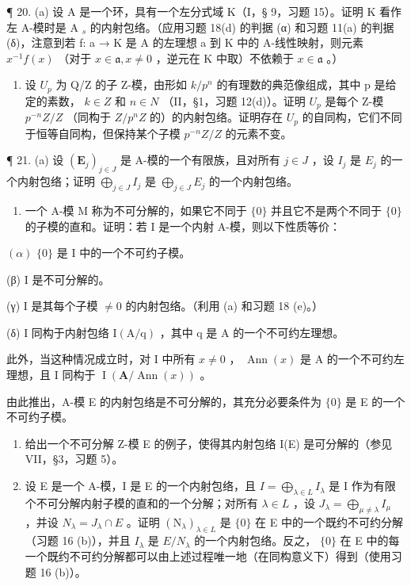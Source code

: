 ¶ 20. (a) 设 A 是一个环，具有一个左分式域 K（I，§ 9，习题 15）。证明 K 看作左 A-模时是 A \(_{s}\) 的内射包络。（应用习题 18(d) 的判据 (α) 和习题 11(a) 的判据 (δ)，注意到若 f: a → K 是 A 的左理想 a 到 K 中的 A-线性映射，则元素 \(x^{-1}f(x)\) （对于 \(x \in \mathfrak{a}, x \neq 0\) ，逆元在 K 中取）不依赖于 \(x \in \mathfrak{a}\) 。）

\begin{enumerate}
\def\labelenumi{(\alph{enumi})}
\setcounter{enumi}{1}
\tightlist
\item
  设 \(U_{p}\) 为 Q/Z 的子 Z-模，由形如 \(k/p^{n}\) 的有理数的典范像组成，其中 p 是给定的素数， \(k \in Z\) 和 \(n \in N\) （II，§1，习题 12(d)）。证明 \(U_{p}\) 是每个 Z-模 \(p^{-n}Z/Z\) （同构于 \(Z/p^{n}Z\) 的）的内射包络。证明存在 \(U_{p}\) 的自同构，它们不同于恒等自同构，但保持某个子模 \(p^{-n}Z/Z\) 的元素不变。
\end{enumerate}

¶ 21. (a) 设 \((\mathbf{E}_j)_{j \in J}\) 是 A-模的一个有限族，且对所有 \(j \in J\) ，设 \(I_j\) 是 \(E_j\) 的一个内射包络；证明 \(\bigoplus_{j \in J} I_j\) 是 \(\bigoplus_{j \in J} E_j\) 的一个内射包络。

\begin{enumerate}
\def\labelenumi{(\alph{enumi})}
\setcounter{enumi}{1}
\tightlist
\item
  一个 A-模 M 称为不可分解的，如果它不同于 \(\{0\}\) 并且它不是两个不同于 \(\{0\}\) 的子模的直和。证明：若 I 是一个内射 A-模，则以下性质等价：
\end{enumerate}

\((\alpha)\) \(\{0\}\) 是 I 中的一个不可约子模。

(β) I 是不可分解的。

(γ) I 是其每个子模 \(\neq0\) 的内射包络。（利用 (a) 和习题 18 (e)。）

(δ) I 同构于内射包络 \(\mathrm{I}(\mathrm{A}/\mathrm{q})\) ，其中 q 是 A 的一个不可约左理想。

此外，当这种情况成立时，对 I 中所有 \(x \neq 0\) ， \(\operatorname{Ann}(x)\) 是 A 的一个不可约左理想，且 I 同构于 \(\operatorname{I}(\mathbf{A} / \operatorname{Ann}(x))\) 。

由此推出，A-模 E 的内射包络是不可分解的，其充分必要条件为 \(\{0\}\) 是 E 的一个不可约子模。

\begin{enumerate}
\def\labelenumi{(\alph{enumi})}
\setcounter{enumi}{2}
\item
  给出一个不可分解 Z-模 E 的例子，使得其内射包络 I(E) 是可分解的（参见 VII，§3，习题 5）。
\item
  设 E 是一个 A-模，I 是 E 的一个内射包络，且 \(I = \bigoplus_{\lambda \in L} I_{\lambda}\) 是 I 作为有限个不可分解内射子模的直和的一个分解；对所有 \(\lambda \in L\) ，设 \(J_{\lambda} = \bigoplus_{\mu \neq \lambda} I_{\mu}\) ，并设 \(N_{\lambda} = J_{\lambda} \cap E\) 。证明 \((\mathrm{N}_{\lambda})_{\lambda \in L}\) 是 \(\{0\}\) 在 E 中的一个既约不可约分解（习题 16 (b)），并且 \(I_{\lambda}\) 是 \(E/N_{\lambda}\) 的一个内射包络。反之， \(\{0\}\) 在 E 中的每一个既约不可约分解都可以由上述过程唯一地（在同构意义下）得到（使用习题 16 (b)）。
\end{enumerate}

